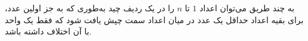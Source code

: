 \EXERCISE
به چند طریق می‌توان اعداد
$1$
تا
$n$
را در یک ردیف چید به‌طوری که به جز اولین عدد، برای بقیه اعداد حداقل یک عدد در میان اعداد سمت چپش یافت شود که فقط یک واحد با آن اختلاف داشته باشد.